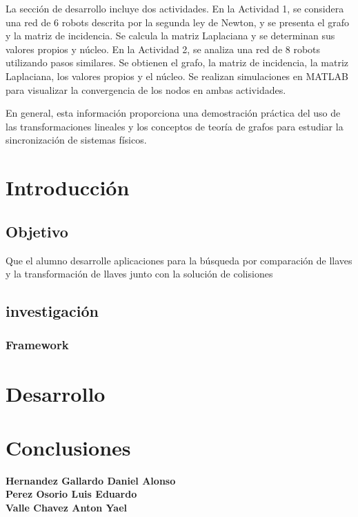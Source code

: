 \documentclass{report}
\begin{document}
La sección de desarrollo incluye dos actividades. En la Actividad 1, se considera una red de 6 robots descrita por la segunda ley de Newton, y se presenta el grafo y la matriz de incidencia. Se calcula la matriz Laplaciana y se determinan sus valores propios y núcleo. En la Actividad 2, se analiza una red de 8 robots utilizando pasos similares. Se obtienen el grafo, la matriz de incidencia, la matriz Laplaciana, los valores propios y el núcleo. Se realizan simulaciones en MATLAB para visualizar la convergencia de los nodos en ambas actividades.

En general, esta información proporciona una demostración práctica del uso de las transformaciones lineales y los conceptos de teoría de grafos para estudiar la sincronización de sistemas físicos.



\tableofcontents

  

\chapter{Introducción} 
    \section{Objetivo}
    Que el alumno desarrolle aplicaciones para la búsqueda por comparación de llaves y la
    transformación de llaves junto con la solución de colisiones
    \section{investigación}
      \subsection*{Framework}
\newpage
\chapter{Desarrollo}

\chapter{Conclusiones}
\textbf{Hernandez Gallardo Daniel Alonso} \\
\newpage
\textbf{Perez Osorio Luis Eduardo} \\
\newpage
\textbf{Valle Chavez Anton Yael} \\
\newpage
\nocite{*}
  \newpage

\end{document}
